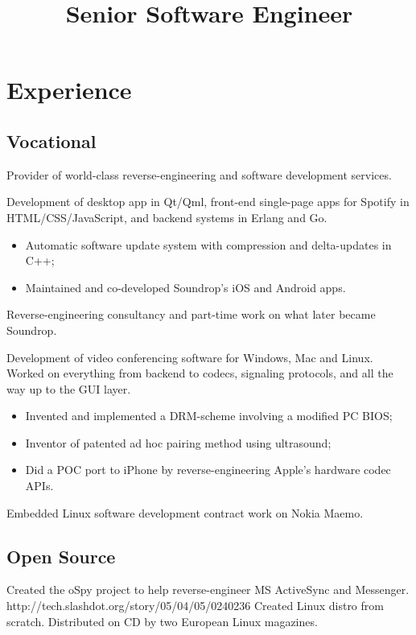 \documentclass[11pt,a4paper,sans]{moderncv}
\title{Senior Software Engineer}
\begin{document}
\makecvtitle

\section{Experience}
\subsection{Vocational}
{Provider of world-class reverse-engineering and software development services.}
{Development of desktop app in Qt/Qml, front-end single-page apps for Spotify
in HTML/CSS/JavaScript, and backend systems in Erlang and Go.
\begin{itemize}
\item Automatic software update system with compression and delta-updates in C++;
\item Maintained and co-developed Soundrop's iOS and Android apps.
\end{itemize}}
{Reverse-engineering consultancy and part-time work on what later became Soundrop.}
{Development of video conferencing software for Windows, Mac and Linux.
Worked on everything from backend to codecs, signaling protocols, and all the
way up to the GUI layer.
\begin{itemize}
\item Invented and implemented a DRM-scheme involving a modified PC BIOS;
\item Inventor of patented ad hoc pairing method using ultrasound;
\item Did a POC port to iPhone by reverse-engineering Apple's hardware codec APIs.
\end{itemize}}
{Embedded Linux software development contract work on Nokia Maemo.}
\subsection{Open Source}
{Created the oSpy project to help reverse-engineer MS ActiveSync and Messenger.}
{http://tech.slashdot.org/story/05/04/05/0240236}
{Created Linux distro from scratch. Distributed on CD by two European Linux magazines.}

\nocite{*}


\end{document}
